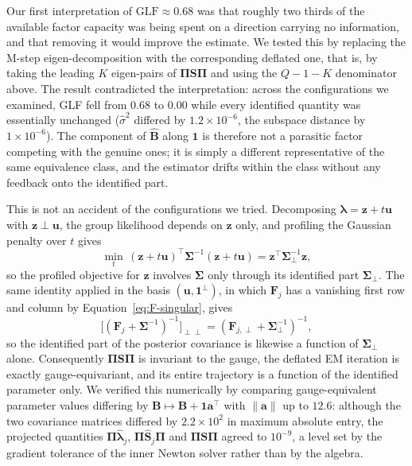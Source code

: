 Our first interpretation of $\mathrm{GLF}\approx0.68$ was that roughly two thirds of the available factor capacity was being spent on a direction carrying no information, and that removing it would improve the estimate. We tested this by replacing the M-step eigen-decomposition with the corresponding deflated one, that is, by taking the leading $K$ eigen-pairs of $\bm{\Pi}\mathbf{S}\bm{\Pi}$ and using the $Q-1-K$ denominator above. The result contradicted the interpretation: across the configurations we examined, GLF fell from $0.68$ to $0.00$ while every identified quantity was essentially unchanged ($\hat\sigma^2$ differed by $1.2\times10^{-6}$, the subspace distance by $1\times10^{-6}$). The component of $\hat{\mathbf{B}}$ along $\mathbf{1}$ is therefore not a parasitic factor competing with the genuine ones; it is simply a different representative of the same equivalence class, and the estimator drifts within the class without any feedback onto the identified part.

This is not an accident of the configurations we tried. Decomposing $\bm{\lambda}=\mathbf{z}+t\mathbf{u}$ with $\mathbf{z}\perp\mathbf{u}$, the group likelihood depends on $\mathbf{z}$ only, and profiling the Gaussian penalty over $t$ gives
\begin{equation}
\min_t\,(\mathbf{z}+t\mathbf{u})^\top\bm{\Sigma}^{-1}(\mathbf{z}+t\mathbf{u})=\mathbf{z}^\top\bm{\Sigma}_\perp^{-1}\mathbf{z},
\label{eq:profile-identity}
\end{equation}
so the profiled objective for $\mathbf{z}$ involves $\bm{\Sigma}$ only through its identified part $\bm{\Sigma}_\perp$. The same identity applied in the basis $(\mathbf{u},\mathbf{1}^\perp)$, in which $\mathbf{F}_j$ has a vanishing first row and column by Equation~\eqref{eq:F-singular}, gives
\begin{equation}
\Big[(\mathbf{F}_j+\bm{\Sigma}^{-1})^{-1}\Big]_{\perp\perp}=(\mathbf{F}_{j,\perp}+\bm{\Sigma}_\perp^{-1})^{-1},
\label{eq:posterior-identity}
\end{equation}
so the identified part of the posterior covariance is likewise a function of $\bm{\Sigma}_\perp$ alone. Consequently $\bm{\Pi}\mathbf{S}\bm{\Pi}$ is invariant to the gauge, the deflated EM iteration is exactly gauge-equivariant, and its entire trajectory is a function of the identified parameter only. We verified this numerically by comparing gauge-equivalent parameter values differing by $\mathbf{B}\mapsto\mathbf{B}+\mathbf{1}\mathbf{a}^\top$ with $\lVert\mathbf{a}\rVert$ up to $12.6$: although the two covariance matrices differed by $2.2\times10^2$ in maximum absolute entry, the projected quantities $\bm{\Pi}\hat{\bm{\lambda}}_j$, $\bm{\Pi}\hat{\mathbf{S}}_j\bm{\Pi}$ and $\bm{\Pi}\mathbf{S}\bm{\Pi}$ agreed to $10^{-9}$, a level set by the gradient tolerance of the inner Newton solver rather than by the algebra.

